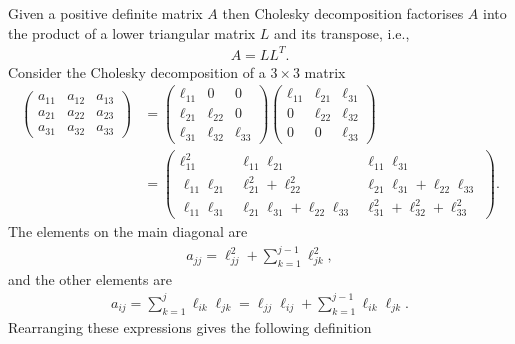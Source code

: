 \documentclass[letterpaper,10pt,english]{jupyterBook}
\begin{document}
\sphinxAtStartPar
Given a positive definite matrix \(A\) then Cholesky decomposition factorises \(A\) into the product of a lower triangular matrix \(L\) and its transpose, i.e.,
\begin{align*}
    A = LL^T.
\end{align*}
\sphinxAtStartPar
Consider the Cholesky decomposition of a \(3\times 3\) matrix
\begin{align*}
    \begin{pmatrix}
        a_{11}  & a_{12}  & a_{13} \\
        a_{21}  & a_{22}  & a_{23} \\
        a_{31}  & a_{32}  & a_{33} 
    \end{pmatrix} &= 
    \begin{pmatrix}
        \ell_{11}  & 0 & 0 \\
        \ell_{21}  & \ell_{22}  & 0 \\
        \ell_{31}  & \ell_{32}  & \ell_{33} 
    \end{pmatrix}
    \begin{pmatrix}
        \ell_{11}  & \ell_{21}  & \ell_{31} \\
        0 & \ell_{22}  & \ell_{32} \\
        0 & 0 & \ell_{33} 
    \end{pmatrix}\\
    &= 
    \begin{pmatrix}
        \ell_{11}^2  & \ell_{11} \ell_{21}  & \ell_{11} \ell_{31} \\
        \ell_{11} \ell_{21}  & \ell_{21}^2 +\ell_{22}^2  & \ell_{21} \ell_{31} +\ell_{22} \ell_{33} \\
        \ell_{11} \ell_{31}  & \ell_{21} \ell_{31} +\ell_{22} \ell_{33}  & \ell_{31}^2 +\ell_{32}^2 +\ell_{33}^2 
    \end{pmatrix}.
\end{align*}
\sphinxAtStartPar
The elements on the main diagonal are
\begin{align*}
    a_{jj} =\ell_{jj}^2 +\sum_{k=1}^{j-1} \ell_{jk}^2 ,
\end{align*}
\sphinxAtStartPar
and the other elements are
\begin{align*}
    a_{ij} =\sum_{k=1}^j \ell_{ik} \ell_{jk} = \ell_{jj} \ell_{ij} +\sum_{k=1}^{j-1} \ell_{ik} \ell_{jk}.
\end{align*}
\sphinxAtStartPar
Rearranging these expressions gives the following definition
\end{document}
